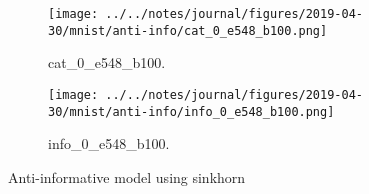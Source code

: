 \begin{figure}[!htbp]
   \centering
\begin{subfigure}[t]{0.48\textwidth}
   \texttt{[image: ../../notes/journal/figures/2019-04-30/mnist/anti-info/cat\_0\_e548\_b100.png]}
   \caption{cat_0_e548_b100.}
   \label{fig:.._.._notes_journal_figures_2019-04-30_mnist_anti-info-a}
\end{subfigure}
\begin{subfigure}[t]{0.48\textwidth}
   \texttt{[image: ../../notes/journal/figures/2019-04-30/mnist/anti-info/info\_0\_e548\_b100.png]}
   \caption{info_0_e548_b100.}
   \label{fig:.._.._notes_journal_figures_2019-04-30_mnist_anti-info-b}
\end{subfigure}
   \caption{Anti-informative model using sinkhorn}
   \label{fig:.._.._notes_journal_figures_2019-04-30_mnist_anti-info}
\end{figure}